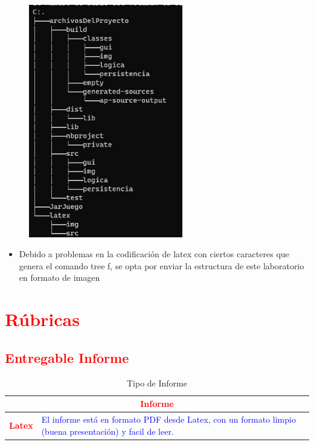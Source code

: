\documentclass{article}
\begin{document}
	\begin{figure}[H]
		\centering
		\includegraphics[width=0.6\textwidth,keepaspectratio]{img/tree.jpg}
	\end{figure}	
	
	\begin{itemize}	
		\item Debido a problemas en la codificación de latex con ciertos caracteres que genera el comando tree f, se opta 
		por enviar la estructura de este laboratorio en formato de imagen
	\end{itemize}
	

   
	
	\section{\textcolor{red}{Rúbricas}}
	
	\subsection{\textcolor{red}{Entregable Informe}}
	\begin{table}[H]
		\caption{Tipo de Informe}
		\setlength{\tabcolsep}{0.5em} %
		{\renewcommand{\arraystretch}{1.5}%
			\begin{tabular}{|p{3cm}|p{12cm}|}
				\hline
				\multicolumn{2}{|c|}{\textbf{\textcolor{red}{Informe}}}  \\
				\hline 
				\textbf{\textcolor{red}{Latex}} & \textcolor{blue}{El informe está en formato PDF desde Latex,  con un formato limpio (buena presentación) y facil de leer.}   \\ 
				\hline 
				
				
			\end{tabular}
		}
	\end{table}
	
\end{document}
